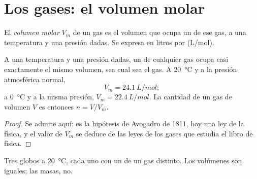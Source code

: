 \section{Los gases: el volumen molar}

\begin{definition}\label{def:g10:the-mole:molar-volume}
El \emph{volumen molar} $V_m$ de un gas es el
volumen que ocupa un  de ese gas, a una temperatura y una presión
dadas. Se expresa en litros por  (\si{L/mol}).
\end{definition}

\begin{proposition}\label{prop:g10:the-mole:avogadro-law}
A una temperatura y una presión dadas, un  de cualquier gas ocupa
casi exactamente el mismo volumen, sea cual sea el gas. A
\qty{20}{\celsius} y a la presión atmosférica normal,
\[
  V_m = \qty{24.1}{L/mol};
\]
a \qty{0}{\celsius} y a la misma presión, $V_m = \qty{22.4}{L/mol}$. La
cantidad de un gas de volumen $V$ es entonces $n = V / V_m$.
\end{proposition}

\begin{proof}
Se admite aquí: es la hipótesis de Avogadro de 1811, hoy una ley de la
física, y el valor de $V_m$ se deduce de las leyes de los gases que
estudia el libro de física.
\end{proof}

\begin{omfigure}

{\small Tres globos a \qty{20}{\celsius}, cada uno con un  de un gas
distinto. Los volúmenes son iguales; las masas, no.}
\end{omfigure}


